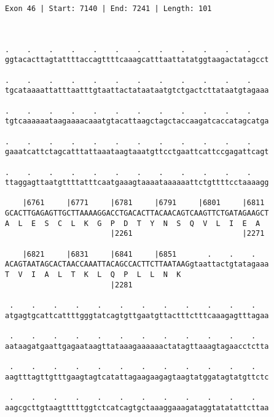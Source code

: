 \documentclass{article}
\begin{document}
\begin{Verbatim}
Exon 46 | Start: 7140 | End: 7241 | Length: 101



.    .    .    .    .    .    .    .    .    .    .    .    
ggtacacttagtattttaccagttttcaaagcatttaattatatggtaagactatagcct
                                                            
.    .    .    .    .    .    .    .    .    .    .    .    
tgcataaaattatttaatttgtaattactataataatgtctgactcttataatgtagaaa
                                                            
.    .    .    .    .    .    .    .    .    .    .    .    
tgtcaaaaaataagaaaacaaatgtacattaagctagctaccaagatcaccatagcatga
                                                            
.    .    .    .    .    .    .    .    .    .    .    .    
gaaatcattctagcatttattaaataagtaaatgttcctgaattcattccgagattcagt
                                                            
.    .    .    .    .    .    .    .    .    .    .    .    
ttaggagttaatgttttatttcaatgaaagtaaaataaaaaattctgttttcctaaaagg
                                                            
    |6761     |6771     |6781     |6791     |6801     |6811 
GCACTTGAGAGTTGCTTAAAAGGACCTGACACTTACAACAGTCAAGTTCTGATAGAAGCT
A  L  E  S  C  L  K  G  P  D  T  Y  N  S  Q  V  L  I  E  A  
                        |2261                         |2271 
  
    |6821     |6831     |6841     |6851       .    .    .   
ACAGTAATAGCACTAACCAAATTACAGCCACTTCTTAATAAGgtaattactgtatagaaa
T  V  I  A  L  T  K  L  Q  P  L  L  N  K                    
                        |2281                               
  
 .    .    .    .    .    .    .    .    .    .    .    .   
atgagtgcattcattttgggtatcagtgttgaatgttactttctttcaaagagtttagaa
                                                            
 .    .    .    .    .    .    .    .    .    .    .    .   
aataagatgaattgagaataagttataaagaaaaaactatagttaaagtagaacctctta
                                                            
 .    .    .    .    .    .    .    .    .    .    .    .   
aagtttagttgtttgaagtagtcatattagaagaagagtaagtatggatagtatgttctc
                                                            
 .    .    .    .    .    .    .    .    .    .    .    .   
aagcgcttgtaagtttttggtctcatcagtgctaaaggaaagataggtatatattcttaa
                                                            

\end{Verbatim}
\end{document}

